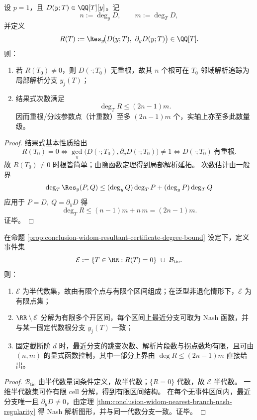 \begin{proposition}[分支点与不可解析参数的结果式证书]\label{prop:conclusion-widom-resultant-certificate-degree-bound}
设 \(p=1\)，且 \(D(y;T)\in\QQ[T][y]\)。记
\[
n:=\deg_y D,\qquad m:=\deg_T D,
\]
并定义
\[
R(T):=\Res_y\!\bigl(D(y;T),\ \partial_yD(y;T)\bigr)\in\QQ[T].
\]
则：
\begin{enumerate}
  \item 若 \(R(T_0)\neq 0\)，则 \(D(\cdot;T_0)\) 无重根，故其 \(n\) 个根可在 \(T_0\) 邻域解析追踪为局部解析分支 \(y_j(T)\)；
  \item 结果式次数满足
  \[
  \deg_T R\le (2n-1)m.
  \]
  因而重根/分歧参数点（计重数）至多 \((2n-1)m\) 个，实轴上亦至多此数量级。
\end{enumerate}
\end{proposition}
\begin{proof}
结果式基本性质给出
\[
R(T_0)=0
\Longleftrightarrow
\gcd_y\!\bigl(D(\cdot;T_0),\partial_yD(\cdot;T_0)\bigr)\neq 1
\Longleftrightarrow
D(\cdot;T_0)\ \text{有重根}.
\]
故 \(R(T_0)\neq 0\) 时根皆简单；由隐函数定理得到局部解析延拓。
次数估计由一般界
\[
\deg_T\Res_y(P,Q)\le (\deg_y Q)\deg_T P+(\deg_y P)\deg_T Q
\]
应用于 \(P=D,\ Q=\partial_yD\) 得
\[
\deg_T R\le (n-1)m+n\,m=(2n-1)m.
\]
证毕。
\end{proof}

\begin{corollary}[最近分支解析片段数的全局有界性]\label{cor:conclusion-widom-event-set-global-finite}
在命题 \ref{prop:conclusion-widom-resultant-certificate-degree-bound} 设定下，定义事件集
\[
\mathcal E:=\{T\in\RR:R(T)=0\}\ \cup\ \mathcal B_{\mathrm{tie}}.
\]
则：
\begin{enumerate}
  \item \(\mathcal E\) 为半代数集，故由有限个点与有限个区间组成；在泛型非退化情形下，\(\mathcal E\) 为有限点集；
  \item \(\RR\setminus\mathcal E\) 分解为有限多个开区间，每个区间上最近分支可取为 Nash 函数，并与某一固定代数根分支 \(y_j(T)\) 一致；
  \item 固定截断阶 \(d\) 时，最近分支的跳变次数、解析片段数与拐点数均有限，且可由 \((n,m)\) 的显式函数控制，其中一部分上界由 \(\deg R\le (2n-1)m\) 直接给出。
\end{enumerate}
\end{corollary}
\begin{proof}
\(\mathcal B_{\mathrm{tie}}\) 由半代数量词条件定义，故半代数；\(\{R=0\}\) 代数，故 \(\mathcal E\) 半代数。
一维半代数集可作有限 cell 分解，得到有限区间结构。
在每个无事件区间内，最近分支唯一且 \(\partial_yD\neq 0\)，由定理 \ref{thm:conclusion-widom-nearest-branch-nash-regularity} 得 Nash 解析图形，并与同一代数分支一致。证毕。
\end{proof}

